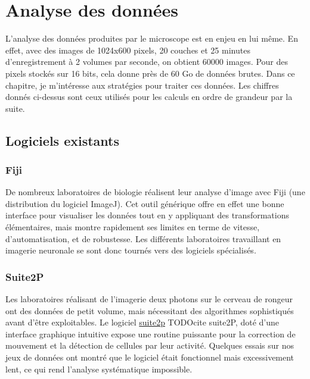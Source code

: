 \section{Analyse des données}

L'analyse des données produites par le microscope est en enjeu en lui même. En effet, avec des images de 1024x600 pixels, 20 couches et 25 minutes d'enregistrement à 2 volumes par seconde, on obtient 60000 images. Pour des pixels stockés sur 16 bits, cela donne près de 60 Go de données brutes. Dans ce chapitre, je m'intéresse aux stratégies pour traiter ces données. Les chiffres donnés ci-dessus sont ceux utilisés pour les calculs en ordre de grandeur par la suite.

\subsection{Logiciels existants}

\subsubsection{Fiji}

De nombreux laboratoires de biologie réalisent leur analyse d'image avec Fiji (une distribution du logiciel ImageJ). Cet outil générique offre en effet une bonne interface pour visualiser les données tout en y appliquant des transformations élémentaires, mais montre rapidement ses limites en terme de vitesse, d'automatisation, et de robustesse. Les différents laboratoires travaillant en imagerie neuronale se sont donc tournés vers des logiciels spécialisés.

\subsubsection{Suite2P}

Les laboratoires réalisant de l'imagerie deux photons sur le cerveau de rongeur ont des données de petit volume, mais nécessitant des algorithmes sophistiqués avant d'être exploitables. Le logiciel \href{https://www.suite2p.org/}{suite2p} TODOcite suite2P, doté d'une interface graphique intuitive expose une routine puissante pour la correction de mouvement et la détection de cellules par leur activité. Quelques essais sur nos jeux de données ont montré que le logiciel était fonctionnel mais excessivement lent, ce qui rend l'analyse systématique impossible.

